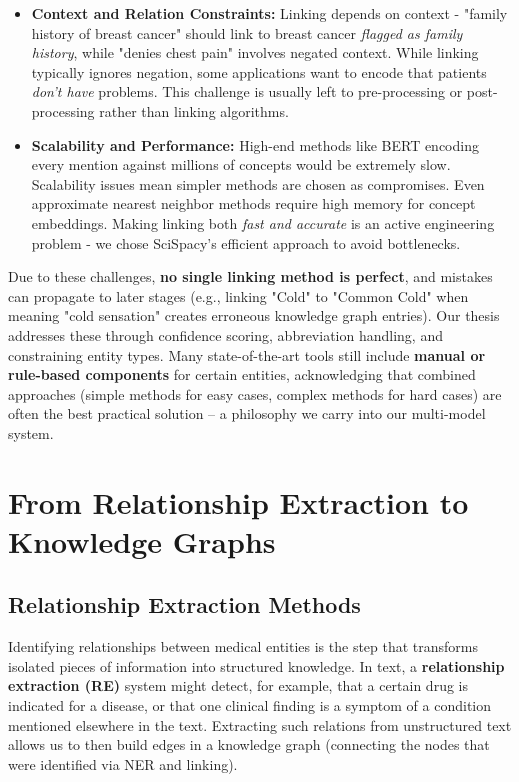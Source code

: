 \begin{itemize}
  \item \textbf{Context and Relation Constraints:} Linking depends on context - "family history of breast cancer" should link to breast cancer \emph{flagged as family history}, while "denies chest pain" involves negated context. While linking typically ignores negation, some applications want to encode that patients \emph{don't have} problems. This challenge is usually left to pre-processing or post-processing rather than linking algorithms.

  \item \textbf{Scalability and Performance:} High-end methods like BERT encoding every mention against millions of concepts would be extremely slow. Scalability issues mean simpler methods are chosen as compromises. Even approximate nearest neighbor methods require high memory for concept embeddings. Making linking both \emph{fast and accurate} is an active engineering problem - we chose SciSpacy's efficient approach to avoid bottlenecks.
\end{itemize}

Due to these challenges, \textbf{no single linking method is perfect}, and mistakes can propagate to later stages (e.g., linking "Cold" to "Common Cold" when meaning "cold sensation" creates erroneous knowledge graph entries). Our thesis addresses these through confidence scoring, abbreviation handling, and constraining entity types. Many state-of-the-art tools still include \textbf{manual or rule-based components} for certain entities, acknowledging that combined approaches (simple methods for easy cases, complex methods for hard cases) are often the best practical solution – a philosophy we carry into our multi-model system.

\section{From Relationship Extraction to Knowledge Graphs}

\subsection{Relationship Extraction Methods}

Identifying relationships between medical entities is the step that transforms isolated pieces of information into structured knowledge. In text, a \textbf{relationship extraction (RE)} system might detect, for example, that a certain drug is indicated for a disease, or that one clinical finding is a symptom of a condition mentioned elsewhere in the text. Extracting such relations from unstructured text allows us to then build edges in a knowledge graph (connecting the nodes that were identified via NER and linking).

